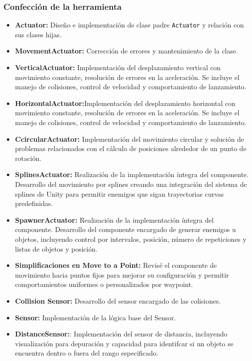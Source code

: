 \subsubsection*{Confección de la herramienta}
\begin{itemize}
	\item \textbf{Actuator:} Diseño e implementación de clase padre \texttt{Actuator} y relación con sus clases hijas.
\item \textbf{MovementActuator:}  Corrección de errores y mantenimiento de la clase.
  \item \textbf{VerticalActuator:} Implementación del desplazamiento vertical con movimiento constante, resolución de errores en la aceleración. Se incluye el manejo
de colisiones, control de velocidad y comportamiento de lanzamiento.

  \item \textbf{HorizontalActuator:}Implementación del desplazamiento horizontal con movimiento constante, resolución de errores en la aceleración. Se incluye el manejo
de colisiones, control de velocidad y comportamiento de lanzamiento.
  \item \textbf{CcircularActuator:} Implementación del movimiento circular y solución de problemas relacionados con el cálculo de posiciones alrededor de un punto de rotación.
  \item \textbf{SplinesActuator:} Realización de la implementación íntegra del
componente. Desarrollo del movimiento por splines creando una integración del sistema de splines de Unity para permitir enemigos que sigan trayectorias curvas predefinidas.
  \item \textbf{SpawnerActuator:} Realización de la implementación íntegra del
componente. Desarrollo del componente encargado de generar enemigos u objetos, incluyendo control por intervalos, posición, número de repeticiones y listas de objetos y posición.
  \item \textbf{Simplificaciones en Move to a Point:} Revisé el componente de movimiento hacia puntos fijos para mejorar su configuración y permitir comportamientos uniformes o personalizados por waypoint.
  \item \textbf{Collision Sensor:}  Desarrollo del sensor encargado de las colisiones.
  \item \textbf{Sensor:} Implementación de la lógica base del Sensor. 
  \item \textbf{DistanceSensor:}: Implementación del sensor de distancia, incluyendo visualización para depuración y capacidad para identifcar si un objeto se encuentra dentro o fuera del rango especificado.

\end{itemize}
